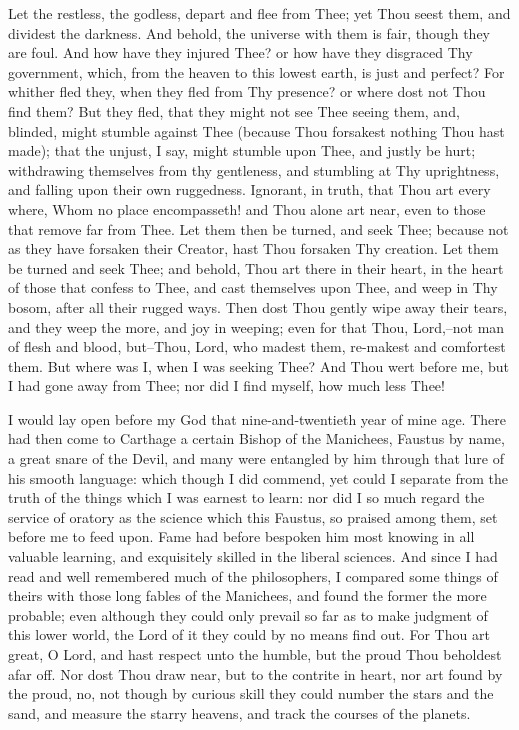 \documentclass[b5paper,openright,12pt,twoside]{book}
\begin{document}
Let the restless, the godless, depart and flee from Thee; yet Thou seest
them, and dividest the darkness. And behold, the universe with them is
fair, though they are foul. And how have they injured Thee? or how have
they disgraced Thy government, which, from the heaven to this lowest
earth, is just and perfect? For whither fled they, when they fled from
Thy presence? or where dost not Thou find them? But they fled, that they
might not see Thee seeing them, and, blinded, might stumble against Thee
(because Thou forsakest nothing Thou hast made); that the unjust, I say,
might stumble upon Thee, and justly be hurt; withdrawing themselves from
thy gentleness, and stumbling at Thy uprightness, and falling upon their
own ruggedness. Ignorant, in truth, that Thou art every where, Whom no
place encompasseth! and Thou alone art near, even to those that remove
far from Thee. Let them then be turned, and seek Thee; because not as
they have forsaken their Creator, hast Thou forsaken Thy creation. Let
them be turned and seek Thee; and behold, Thou art there in their heart,
in the heart of those that confess to Thee, and cast themselves upon
Thee, and weep in Thy bosom, after all their rugged ways. Then dost
Thou gently wipe away their tears, and they weep the more, and joy
in weeping; even for that Thou, Lord,--not man of flesh and blood,
but--Thou, Lord, who madest them, re-makest and comfortest them. But
where was I, when I was seeking Thee? And Thou wert before me, but I had
gone away from Thee; nor did I find myself, how much less Thee!

I would lay open before my God that nine-and-twentieth year of mine
age. There had then come to Carthage a certain Bishop of the Manichees,
Faustus by name, a great snare of the Devil, and many were entangled
by him through that lure of his smooth language: which though I did
commend, yet could I separate from the truth of the things which I was
earnest to learn: nor did I so much regard the service of oratory as the
science which this Faustus, so praised among them, set before me to
feed upon. Fame had before bespoken him most knowing in all valuable
learning, and exquisitely skilled in the liberal sciences. And since I
had read and well remembered much of the philosophers, I compared some
things of theirs with those long fables of the Manichees, and found the
former the more probable; even although they could only prevail so far
as to make judgment of this lower world, the Lord of it they could by
no means find out. For Thou art great, O Lord, and hast respect unto the
humble, but the proud Thou beholdest afar off. Nor dost Thou draw near,
but to the contrite in heart, nor art found by the proud, no, not though
by curious skill they could number the stars and the sand, and measure
the starry heavens, and track the courses of the planets.
\end{document}

